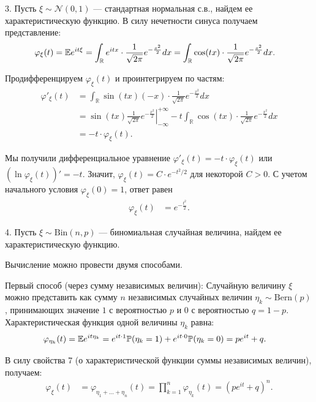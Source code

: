 3. Пусть $\xi \sim \mathcal{N}(0, 1)$ --- стандартная нормальная с.в., найдем ее характеристическую функцию. В силу нечетности синуса получаем представление:
\begin{align*}
    \varphi_\xi(t) &= \mathbb{E} e^{it\xi} = \int_{\mathbb{R}} e^{itx} \cdot \frac{1}{\sqrt{2\pi}} e^{-\frac{x^2}{2}} dx = \int_{\mathbb{R}} \cos(tx) \cdot \frac{1}{\sqrt{2\pi}} e^{-\frac{x^2}{2}} dx.
\end{align*}

Продифференцируем $\varphi_\xi(t)$ и проинтегрируем по частям:
\begin{align*}
    \varphi'_\xi(t) &= \int_{\mathbb{R}} \sin(tx)(-x) \cdot \frac{1}{\sqrt{2\pi}} e^{-\frac{x^2}{2}} dx \\
    &= \left. \sin(tx) \frac{1}{\sqrt{2\pi}} e^{-\frac{x^2}{2}} \right|_{-\infty}^{+\infty} - t \int_{\mathbb{R}} \cos(tx) \cdot \frac{1}{\sqrt{2\pi}} e^{-\frac{x^2}{2}} dx \\
    &= -t \cdot \varphi_\xi(t).
\end{align*}

Мы получили дифференциальное уравнение $\varphi'_\xi(t) = -t \cdot \varphi_\xi(t)$ или $(\ln \varphi_\xi(t))' = -t$. Значит, $\varphi_\xi(t) = C \cdot e^{-t^2/2}$ для некоторой $C > 0$. С учетом начального условия $\varphi_\xi(0) = 1$, ответ равен
\begin{align*}
    \varphi_\xi(t) &= e^{-\frac{t^2}{2}}.
\end{align*}

4. Пусть $\xi \sim \text{Bin}(n, p)$ --- биномиальная случайная величина, найдем ее характеристическую функцию.

Вычисление можно провести двумя способами. 

Первый способ (через сумму независимых величин):
Случайную величину $\xi$ можно представить как сумму $n$ независимых случайных величин $\eta_k \sim \text{Bern}(p)$, принимающих значение $1$ с вероятностью $p$ и $0$ с вероятностью $q = 1 - p$.
Характеристическая функция одной величины $\eta_k$ равна:
\begin{align*}
    \varphi_{\eta_k}(t) &= \mathbb{E} e^{it\eta_k} = e^{it \cdot 1} \mathbb{P}(\eta_k = 1) + e^{it \cdot 0} \mathbb{P}(\eta_k = 0) = pe^{it} + q.
\end{align*}

В силу свойства 7 (о характеристической функции суммы независимых величин), получаем:
\begin{align*}
    \varphi_\xi(t) &= \varphi_{\eta_1 + \dots + \eta_n}(t) = \prod_{k=1}^n \varphi_{\eta_k}(t) = (pe^{it} + q)^n.
\end{align*}

